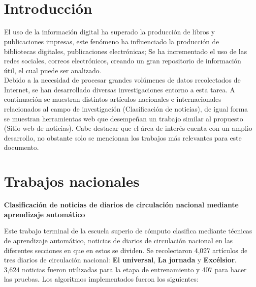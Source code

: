 
\ \\\\
\section{Introducción}


El uso de la información digital ha superado la producción de libros y publicaciones impresas, este fenómeno ha influenciado la producción de bibliotecas digitales, publicaciones electrónicas; Se ha incrementado el uso de las redes sociales, correos electrónicos, creando un gran repositorio de información útil, el cual puede ser analizado\citep{CD1}.\\

Debido a la necesidad de procesar grandes volúmenes de datos recolectados de Internet, se han desarrollado diversas investigaciones entorno a esta tarea. A continuación se muestran distintos artículos nacionales e internacionales relacionados al campo de investigación (Clasificación de noticias), de igual forma se muestran herramientas web que desempeñan un trabajo similar al propuesto (Sitio web de noticias). Cabe destacar que el área de interés cuenta con un amplio desarrollo, no obstante solo se mencionan los trabajos más relevantes para este documento.


\section{Trabajos nacionales}


\begin{large}
	 \textbf{Clasificación de noticias de diarios de circulación nacional mediante aprendizaje automático }\\
\end{large}


Este trabajo terminal de la escuela superio de cómputo \citep{CD2} clasifica mediante técnicas de aprendizaje automático, noticias de diarios de circulación nacional en las diferentes secciones en que en estos se dividen. Se recolectaron 4,027 artículos de tres diarios de circulación nacional: \textbf{El universal}, \textbf{La jornada} y \textbf{Excélsior}. 3,624 noticias fueron utilizadas para la etapa de entrenamiento y 407 para hacer las pruebas. Los algoritmos implementados fueron los siguientes: \\

